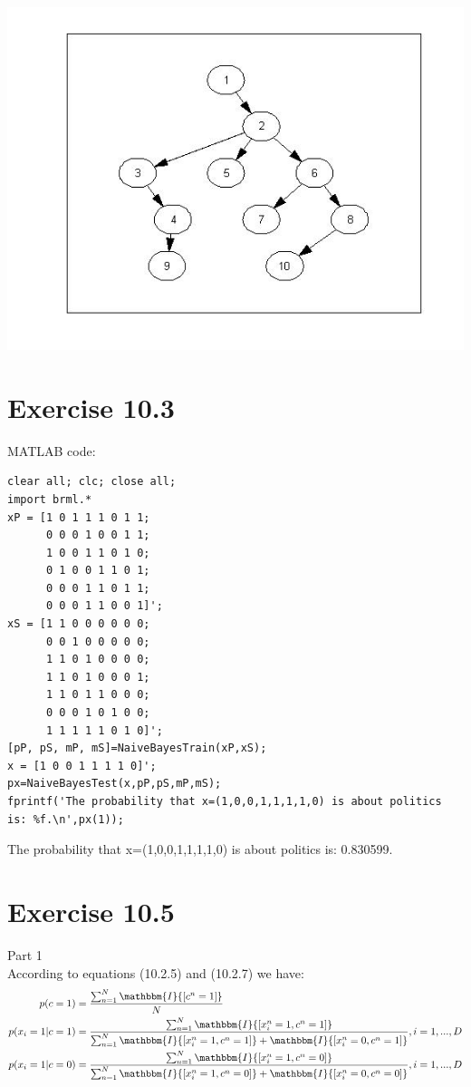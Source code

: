 \documentclass[11pt,a4paper,oneside]{report}
\begin{document}
	\begin{center} \includegraphics[width=1\textwidth]{c9e13chowliutree}\end{center}

\section*{Exercise 10.3}
MATLAB code:
\begin{lstlisting}
clear all; clc; close all;
import brml.*
xP = [1 0 1 1 1 0 1 1;
      0 0 0 1 0 0 1 1;
      1 0 0 1 1 0 1 0;
      0 1 0 0 1 1 0 1;
      0 0 0 1 1 0 1 1;
      0 0 0 1 1 0 0 1]';
xS = [1 1 0 0 0 0 0 0;
      0 0 1 0 0 0 0 0;
      1 1 0 1 0 0 0 0;
      1 1 0 1 0 0 0 1;
      1 1 0 1 1 0 0 0;
      0 0 0 1 0 1 0 0;
      1 1 1 1 1 0 1 0]';
[pP, pS, mP, mS]=NaiveBayesTrain(xP,xS);
x = [1 0 0 1 1 1 1 0]';
px=NaiveBayesTest(x,pP,pS,mP,mS);
fprintf('The probability that x=(1,0,0,1,1,1,1,0) is about politics is: %f.\n',px(1));
\end{lstlisting}

The probability that x=(1,0,0,1,1,1,1,0) is about politics is: 0.830599.

\section*{Exercise 10.5}

Part 1\\
According to equations (10.2.5) and (10.2.7) we have:
\begin{align*}
p(c=1) &=  \frac{\sum_{n=1}^N \mathbbm{I}{[c^n=1]}}{N}\\
p(x_i=1|c=1) &=  \frac{\sum_{n=1}^N \mathbbm{I}{[x_i^n=1,c^n=1]}}{\sum_{n=1}^N \mathbbm{I}{[x_i^n=1,c^n=1]}+\mathbbm{I}{[x_i^n=0,c^n=1]}},i=1,...,D\\
p(x_i=1|c=0) &=  \frac{\sum_{n=1}^N \mathbbm{I}{[x_i^n=1,c^n=0]}}{\sum_{n=1}^N \mathbbm{I}{[x_i^n=1,c^n=0]}+\mathbbm{I}{[x_i^n=0,c^n=0]}},i=1,...,D
\end{align*}
\end{document}
